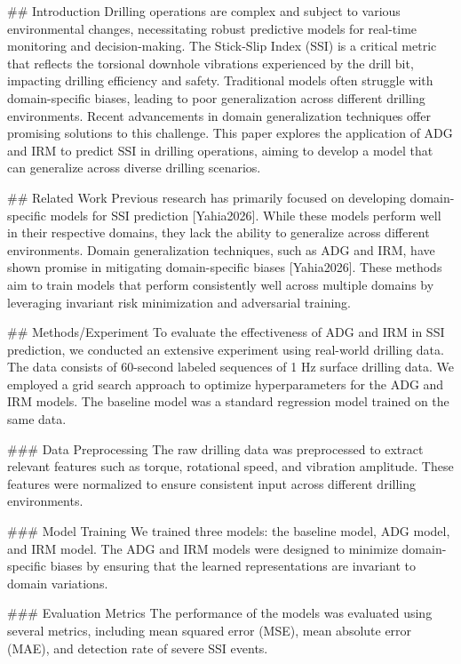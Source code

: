 ## Introduction
Drilling operations are complex and subject to various environmental changes, necessitating robust predictive models for real-time monitoring and decision-making. The Stick-Slip Index (SSI) is a critical metric that reflects the torsional downhole vibrations experienced by the drill bit, impacting drilling efficiency and safety. Traditional models often struggle with domain-specific biases, leading to poor generalization across different drilling environments. Recent advancements in domain generalization techniques offer promising solutions to this challenge. This paper explores the application of ADG and IRM to predict SSI in drilling operations, aiming to develop a model that can generalize across diverse drilling scenarios.

## Related Work
Previous research has primarily focused on developing domain-specific models for SSI prediction [Yahia2026]. While these models perform well in their respective domains, they lack the ability to generalize across different environments. Domain generalization techniques, such as ADG and IRM, have shown promise in mitigating domain-specific biases [Yahia2026]. These methods aim to train models that perform consistently well across multiple domains by leveraging invariant risk minimization and adversarial training.

## Methods/Experiment
To evaluate the effectiveness of ADG and IRM in SSI prediction, we conducted an extensive experiment using real-world drilling data. The data consists of 60-second labeled sequences of 1 Hz surface drilling data. We employed a grid search approach to optimize hyperparameters for the ADG and IRM models. The baseline model was a standard regression model trained on the same data.

### Data Preprocessing
The raw drilling data was preprocessed to extract relevant features such as torque, rotational speed, and vibration amplitude. These features were normalized to ensure consistent input across different drilling environments.

### Model Training
We trained three models: the baseline model, ADG model, and IRM model. The ADG and IRM models were designed to minimize domain-specific biases by ensuring that the learned representations are invariant to domain variations.

### Evaluation Metrics
The performance of the models was evaluated using several metrics, including mean squared error (MSE), mean absolute error (MAE), and detection rate of severe SSI events.

